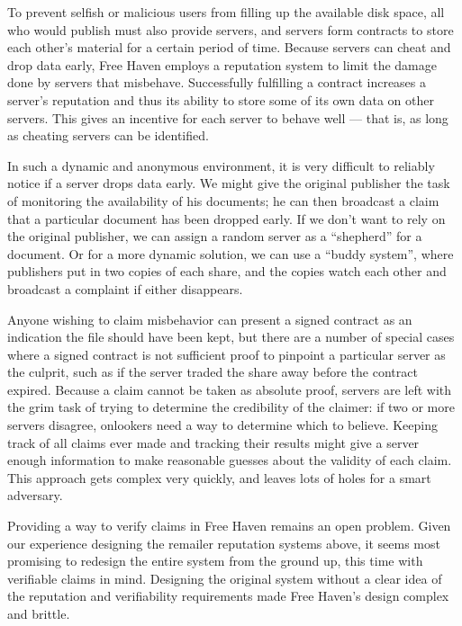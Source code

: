 \documentclass[times,10pt,twocolumn]{article}
\begin{document}
To prevent selfish or malicious users from filling up the available disk
space, all who would publish must also provide servers, and servers form
contracts to store each other's material for a certain period of time.
Because servers can cheat and drop data early, Free Haven employs a
reputation system to limit the damage done by servers that misbehave.
Successfully fulfilling a contract increases a server's reputation and
thus its ability to store some of its own data on other servers. This
gives an incentive for each server to behave well --- that is, as long
as cheating servers can be identified.

In such a dynamic and anonymous environment, it is very difficult to
reliably notice if a server drops data early. We might give the original
publisher the task of monitoring the availability of his documents; he can
then broadcast a claim that a particular document has been dropped early.
If we don't want to rely on the original publisher, we can assign a
random server as a ``shepherd'' for a document. Or for a more dynamic
solution, we can use a ``buddy system'', where publishers put in two
copies of each share, and the copies watch each other and broadcast a
complaint if either disappears.

Anyone wishing to claim misbehavior can present a signed contract as
an indication the file should have been kept, but there are a number
of special cases where a signed contract is not sufficient proof to
pinpoint a particular server as the culprit, such as if the server traded
the share away before the contract expired. Because a claim cannot be
taken as absolute proof, servers are left with the grim task of trying
to determine the credibility of the claimer: if two or more servers
disagree, onlookers need a way to determine which to believe. Keeping
track of all claims ever made and tracking their results might give a
server enough information to make reasonable guesses about the validity
of each claim. This approach gets complex very quickly, and leaves lots
of holes for a smart adversary.

Providing a way to verify claims in Free Haven remains an open problem.
Given our experience designing the remailer reputation systems above,
it seems most promising to redesign the entire system from the ground up,
this time with verifiable claims in mind. Designing the original system
without a clear idea of the reputation and verifiability requirements made Free Haven's
design complex and brittle.
\end{document}
